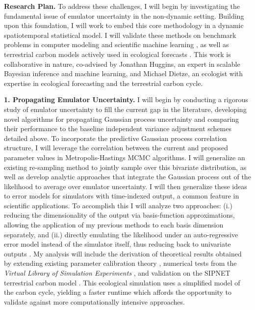 \documentclass[11pt]{article}
\begin{document}


\noindent
\textbf{Research Plan.} To address these challenges, I will begin by investigating the fundamental issue of emulator uncertainty in the 
non-dynamic setting. Building upon this foundation, I will work to embed this core methodology in a dynamic spatiotemporal statistical model. I will validate these methods on benchmark problems in computer modeling and scientific machine learning \cite{Surjanovic, Takamoto}, as well as terrestrial carbon models actively used in ecological forecasts \cite{Dietze}. This work is collaborative in nature, co-advised by Jonathan Huggins, an expert in scalable Bayesian inference and machine learning, and Michael Dietze, an ecologist with expertise in ecological forecasting and the terrestrial carbon cycle. 

 \textbf{1. Propagating Emulator Uncertainty.} I will begin by conducting a rigorous study of emulator uncertainty to fill the current gap in the literature, developing novel algorithms for propagating Gaussian process uncertainty and comparing their performance to the baseline independent variance adjustment schemes detailed above. To incorporate the predictive Gaussian process correlation structure, I will leverage the correlation between the current and proposed parameter values in Metropolis-Hastings MCMC algorithms. I will generalize an existing re-sampling method \cite{Fer} to jointly sample over this bivariate distribution, as well as develop analytic approaches that integrate the Gaussian process out of the likelihood to average over emulator uncertainty. 
I will then generalize these ideas to error models for simulators with time-indexed output, a common feature in scientific applications. To accomplish this I will analyze two approaches: (i.) reducing the dimensionality of the output via basis-function 
 approximations, allowing the application of my previous methods to each basis dimension separately, and (ii.) directly emulating the likelihood under an auto-regressive error model instead of the simulator itself, thus reducing back to univariate outputs \cite{Fer}. 
 My analysis will include the derivation of theoretical results obtained by extending existing parameter calibration theory \cite{Tuo}, numerical tests from the 
 \textit{Virtual Library of Simulation Experiments} \cite{Surjanovic}, and validation on the SIPNET terrestrial carbon model \cite{Fer}. This ecological simulation uses a simplified model of the carbon cycle, yielding a faster runtime which affords the opportunity to validate against more computationally intensive approaches. 
\end{document}
